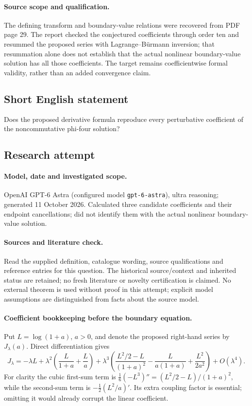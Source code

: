 \documentclass[11pt]{article}
\begin{document}
\paragraph{Source scope and qualification.}
The defining transform and boundary-value relations were recovered from PDF page 29. The report checked the conjectured coefficients through order ten and resummed the proposed series with Lagrange--B\"urmann inversion; that resummation alone does not establish that the actual nonlinear boundary-value solution has all those coefficients. The target remains coefficientwise formal validity, rather than an added convergence claim.
\subsection{Short English statement}
Does the proposed derivative formula reproduce every perturbative coefficient of the noncommutative phi-four solution?
\subsection{Research attempt}
\paragraph{Model, date and investigated scope.}
OpenAI GPT-6 Astra (configured model \texttt{gpt-6-astra}), ultra reasoning; generated 11 October 2026. Calculated three candidate coefficients and their endpoint cancellations; did not identify them with the actual nonlinear boundary-value solution.

\paragraph{Sources and literature check.}
Read the supplied definition, catalogue wording, source qualifications and reference entries for this question. The historical source/context and inherited status are retained; no fresh literature or novelty certification is claimed. No external theorem is used without proof in this attempt; explicit model assumptions are distinguished from facts about the source model.

\paragraph{Coefficient bookkeeping before the boundary equation.} Put \(L=\log(1+a)\), \(a>0\), and denote the proposed right-hand series by \(J_\lambda(a)\). Direct differentiation gives
\[
 J_\lambda=-\lambda L+\lambda^2\left(\frac{L}{1+a}+\frac{L}{a}\right)
 +\lambda^3\left(\frac{L^2/2-L}{(1+a)^2}-\frac{L}{a(1+a)}+\frac{L^2}{2a^2}\right)+O(\lambda^4).
\]
For clarity the cubic first-sum term is \(\frac16(-L^3)''=(L^2/2-L)/(1+a)^2\), while the second-sum term is \(-\frac12(L^2/a)'\). Its extra coupling factor is essential; omitting it would already corrupt the linear coefficient.
\end{document}
